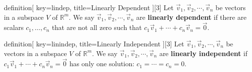 

\begin{SaveConcept}{definition}[
		key=lindep,
		title={Linearly Dependent}
	][3]
        Let $\vec v_1, \vec v_2, \cdots ,\vec v_n$ be vectors in a subspace $V$ of $\mathbb R^m$. We say $\vec v_1, \vec v_2, \cdots ,\vec v_n$ are {\bf linearly dependent} if there are scalars $c_1,\ldots,c_n$ that are not all zero such that $c_1\vec{v}_1+\cdots+c_n\vec{v}_n=\vec{0}$.
\end{SaveConcept}




\begin{SaveConcept}{definition}[
		key=linindep,
		title={Linearly Independent}
	][3]
        Let $\vec v_1, \vec v_2, \cdots ,\vec v_n$ be vectors in a subspace $V$ of $\mathbb R^m$. We say $\vec v_1, \vec v_2, \cdots ,\vec v_n$ are  {\bf linearly independent} if $c_1\vec{v}_1+\cdots+c_n\vec{v}_n=\vec{0}$ has only one solution: $c_1=\cdots=c_n=0$. 
\end{SaveConcept}



